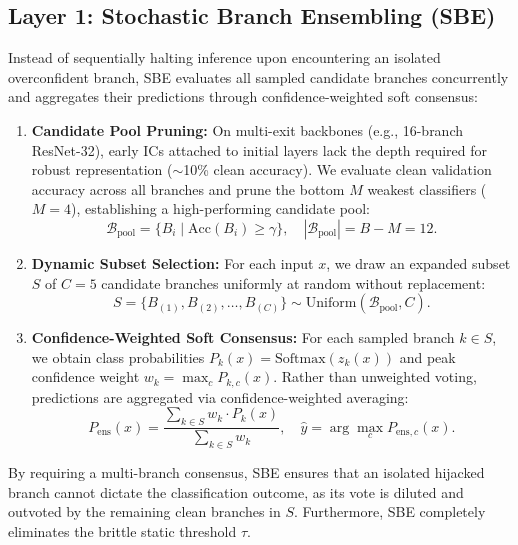 \documentclass[conference]{IEEEtran}
\begin{document}
\subsection{Layer 1: Stochastic Branch Ensembling (SBE)}
Instead of sequentially halting inference upon encountering an isolated overconfident branch, SBE evaluates all sampled candidate branches concurrently and aggregates their predictions through confidence-weighted soft consensus:
\begin{enumerate}
    \item \textbf{Candidate Pool Pruning:} On multi-exit backbones (e.g., 16-branch ResNet-32), early ICs attached to initial layers lack the depth required for robust representation ($\sim$10\% clean accuracy). We evaluate clean validation accuracy across all branches and prune the bottom $M$ weakest classifiers ($M = 4$), establishing a high-performing candidate pool:
    \begin{equation}
        \mathcal{B}_{\text{pool}} = \{B_i \mid \text{Acc}(B_i) \ge \gamma\}, \quad |\mathcal{B}_{\text{pool}}| = B - M = 12.
    \end{equation}
    \item \textbf{Dynamic Subset Selection:} For each input $x$, we draw an expanded subset $S$ of $C = 5$ candidate branches uniformly at random without replacement:
    \begin{equation}
        S = \{B_{(1)}, B_{(2)}, \dots, B_{(C)}\} \sim \text{Uniform}(\mathcal{B}_{\text{pool}}, C).
    \end{equation}
    \item \textbf{Confidence-Weighted Soft Consensus:} For each sampled branch $k \in S$, we obtain class probabilities $P_k(x) = \text{Softmax}(z_k(x))$ and peak confidence weight $w_k = \max_c P_{k, c}(x)$. Rather than unweighted voting, predictions are aggregated via confidence-weighted averaging:
    \begin{equation}
        P_{\text{ens}}(x) = \frac{\sum_{k \in S} w_k \cdot P_k(x)}{\sum_{k \in S} w_k}, \quad \hat{y} = \arg\max_{c} P_{\text{ens}, c}(x).
    \end{equation}
\end{enumerate}
By requiring a multi-branch consensus, SBE ensures that an isolated hijacked branch cannot dictate the classification outcome, as its vote is diluted and outvoted by the remaining clean branches in $S$. Furthermore, SBE completely eliminates the brittle static threshold $\tau$.

\end{document}
